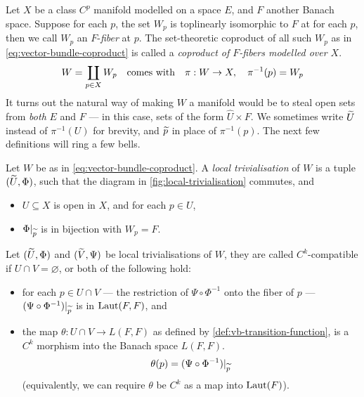\documentclass[../main-v2-manifolds.tex]{subfiles}
\begin{document}
Let $X$ be a class $C^p$ manifold modelled on a space $E$, and $F$ another Banach space. Suppose for each $p$, the set $W_p$ is toplinearly isomorphic to $F$ at for each $p$, then we call $W_p$ an $F$-\emph{fiber} at $p$. The set-theoretic coproduct of all such $W_p$ as in \cref{eq:vector-bundle-coproduct} is called a \emph{coproduct of $F$-fibers modelled over $X$}.
\begin{equation}\label{eq:vector-bundle-coproduct}
    W = \coprod_{p\in X}W_p\qqtext{comes with} \pi: W\to X,\quad \pi^{-1}(p) = W_p
\end{equation}
 It turns out the natural way of making $W$ a manifold would be to steal open sets from \emph{both} $E$ and $F$ --- in this case, sets of the form $\hat{U}\times F$. We sometimes write $\widetilde{U}$ instead of $\pi^{-1}(U)$ for brevity, and $\widetilde{p}$ in place of $\pi^{-1}(p)$. The next few definitions will ring a few bells.
%
%
\begin{definition}\label{def:local-trivialisation}
    Let $W$ be as in \cref{eq:vector-bundle-coproduct}. A \emph{local trivialisation} of $W$ is a tuple $(\widetilde{U}, \Phi)$, such that the diagram in \cref{fig:local-trivialisation} commutes, and
    \begin{itemize}
        \item $U\subseteq X$ is open in $X$, and for each $p\in U$,
        \item $\Phi\vert_{\widetilde{p}}$ is in bijection with $W_p = F$.
    \end{itemize}
\end{definition}
%
%
\begin{definition}\label{def:compatibility-local-trivialisations}
    Let $(\widetilde{U},\Phi)$ and $(\widetilde{V},\Psi)$ be local trivialisations of $W$, they are called $C^k$-compatible if $U\cap V=\varnothing$, or both of the following hold:
    \begin{itemize}
        \item for each $p\in U\cap V$ --- the restriction of $\Psi\circ\Phi^{-1}$ onto the fiber of $p$ --- $(\Psi\circ\Phi^{-1})\vert_{\widetilde{p}}$ is in $\operatorname{Laut}(F,F)$, and
        \item the map $\theta: U\cap V\to L(F,F)$ as defined by \cref{def:vb-transition-function}, is a $C^k$ morphism into the Banach space $L(F,F)$.
        \begin{equation}\label{def:vb-transition-function}
            \theta(p) = (\Psi\circ\Phi^{-1})\vert_{\widetilde{p}}
        \end{equation}
        (equivalently, we can require $\theta$ be $C^k$ as a map into $\operatorname{Laut}(F)$).
    \end{itemize}
\end{definition}
\end{document}
